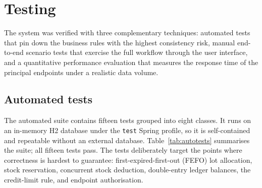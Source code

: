 \section{Testing}
The system was verified with three complementary techniques: automated tests
that pin down the business rules with the highest consistency risk, manual
end-to-end scenario tests that exercise the full workflow through the user
interface, and a quantitative performance evaluation that measures the response
time of the principal endpoints under a realistic data volume.

\subsection{Automated tests}
The automated suite contains fifteen tests grouped into eight classes. It runs
on an in-memory H2 database under the \texttt{test} Spring profile, so it is
self-contained and repeatable without an external database. Table~\ref{tab:autotests}
summarises the suite; all fifteen tests pass. The tests deliberately target the
points where correctness is hardest to guarantee: first-expired-first-out (FEFO)
lot allocation, stock reservation, concurrent stock deduction, double-entry
ledger balances, the credit-limit rule, and endpoint authorisation.

\begin{table}[H]\centering
\caption{Automated test suite (all passing)}
\label{tab:autotests}
\end{table}

